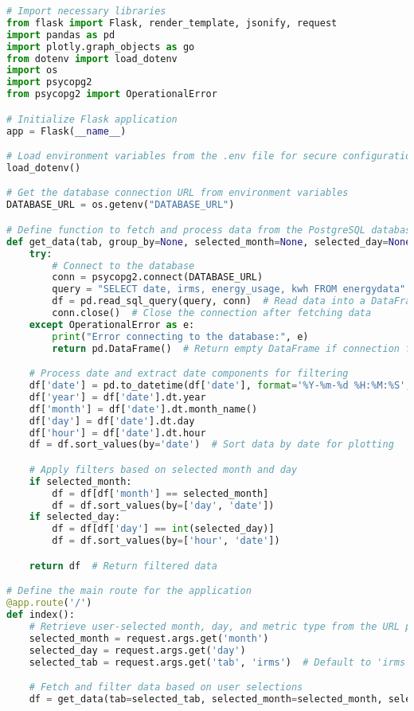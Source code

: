 \begin{lstlisting}[language=Python, caption=app.py, frame=single]
# Import necessary libraries
from flask import Flask, render_template, jsonify, request
import pandas as pd
import plotly.graph_objects as go
from dotenv import load_dotenv
import os
import psycopg2
from psycopg2 import OperationalError

# Initialize Flask application
app = Flask(__name__)

# Load environment variables from the .env file for secure configuration
load_dotenv()

# Get the database connection URL from environment variables
DATABASE_URL = os.getenv("DATABASE_URL")

# Define function to fetch and process data from the PostgreSQL database
def get_data(tab, group_by=None, selected_month=None, selected_day=None):
    try:
        # Connect to the database
        conn = psycopg2.connect(DATABASE_URL)
        query = "SELECT date, irms, energy_usage, kwh FROM energydata"
        df = pd.read_sql_query(query, conn)  # Read data into a DataFrame
        conn.close()  # Close the connection after fetching data
    except OperationalError as e:
        print("Error connecting to the database:", e)
        return pd.DataFrame()  # Return empty DataFrame if connection fails

    # Process date and extract date components for filtering
    df['date'] = pd.to_datetime(df['date'], format='%Y-%m-%d %H:%M:%S', errors='coerce')
    df['year'] = df['date'].dt.year
    df['month'] = df['date'].dt.month_name()
    df['day'] = df['date'].dt.day
    df['hour'] = df['date'].dt.hour
    df = df.sort_values(by='date')  # Sort data by date for plotting

    # Apply filters based on selected month and day
    if selected_month:
        df = df[df['month'] == selected_month]
        df = df.sort_values(by=['day', 'date'])
    if selected_day:
        df = df[df['day'] == int(selected_day)]
        df = df.sort_values(by=['hour', 'date'])

    return df  # Return filtered data

# Define the main route for the application
@app.route('/')
def index():
    # Retrieve user-selected month, day, and metric type from the URL parameters
    selected_month = request.args.get('month')
    selected_day = request.args.get('day')
    selected_tab = request.args.get('tab', 'irms')  # Default to 'irms' tab if none selected

    # Fetch and filter data based on user selections
    df = get_data(tab=selected_tab, selected_month=selected_month, selected_day=selected_day)


\end{lstlisting}
